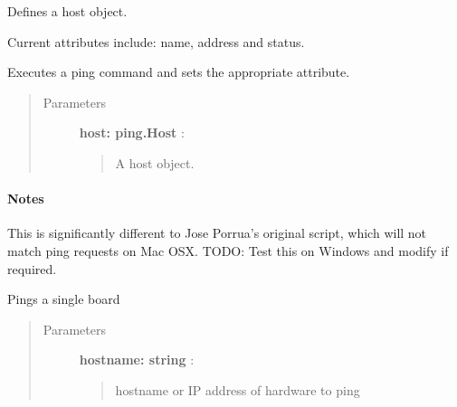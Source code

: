 \documentclass[letterpaper,10pt,english]{sphinxmanual}
\begin{document}
\begin{fulllineitems}
\label{index:ping.Host}
Defines a host object.

Current attributes include: name, address and status.

\end{fulllineitems}



\begin{fulllineitems}
\label{index:ping.execute}
Executes a ping command and sets the appropriate attribute.
\begin{quote}\begin{description}
\item[{Parameters }] \leavevmode
\textbf{host: ping.Host} :
\begin{quote}

A host object.
\end{quote}

\end{description}\end{quote}
\paragraph{Notes}

This is significantly different to Jose Porrua's original script, which will not match
ping requests on Mac OSX. TODO: Test this on Windows and modify if required.

\end{fulllineitems}



\begin{fulllineitems}
\label{index:ping.ping}
Pings a single board
\begin{quote}\begin{description}
\item[{Parameters }] \leavevmode
\textbf{hostname: string} :
\begin{quote}

hostname or IP address of hardware to ping
\end{quote}

\end{description}\end{quote}

\end{fulllineitems}
\end{document}
